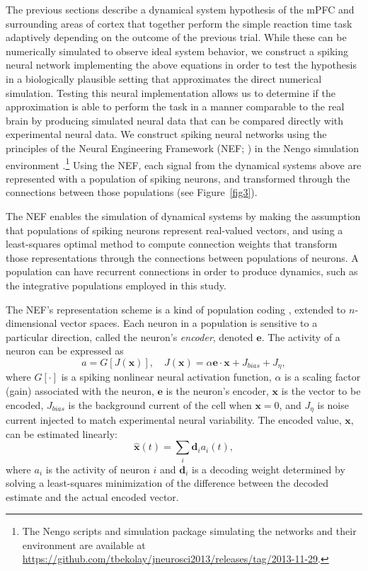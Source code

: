 \documentclass[11pt]{article}
\begin{document}
The previous sections describe
a dynamical system hypothesis
of the mPFC and surrounding areas
of cortex that together
perform the simple reaction time task
adaptively depending on the outcome
of the previous trial.
While these can be numerically simulated
to observe ideal system behavior,
we construct a spiking neural network
implementing the above equations
in order to test the hypothesis
in a biologically plausible setting
that approximates the direct numerical simulation.
Testing this neural implementation
allows us to determine if the approximation
is able to perform the task
in a manner comparable to the real brain
by producing simulated neural data
that can be compared directly with
experimental neural data.
We construct spiking neural networks
using the principles of the Neural Engineering Framework
(NEF; )
in the Nengo simulation environment
\cite{BekolayInpress}.\footnote{The Nengo scripts and simulation
  package simulating the networks and their environment are available
  at \url{https://github.com/tbekolay/jneurosci2013/releases/tag/2013-11-29}.}
Using the NEF, each signal
from the dynamical systems above
are represented with a population of spiking neurons,
and transformed through the connections
between those populations
(see Figure~\ref{fig3}).

The NEF enables the simulation of dynamical systems
by making the assumption that populations of spiking neurons
represent real-valued vectors,
and using a least-squares optimal method
to compute connection weights that
transform those representations
through the connections between
populations of neurons.
A population can have recurrent connections
in order to produce dynamics,
such as the integrative populations
employed in this study.

The NEF's representation scheme
is a kind of population coding
\cite{Georgopoulos1986,Salinas1994},
extended to $n$-dimensional vector spaces.
Each neuron in a population is sensitive
to a particular direction,
called the neuron's \textit{encoder}, denoted $\mathbf{e}$.
The activity of a neuron can be expressed as
\begin{equation} \label{eq:activity}
  a = G[J(\mathbf{x})], \quad
  J(\mathbf{x}) = \alpha \mathbf{e} \cdot \mathbf{x} + J_{bias} + J_\eta,
\end{equation}
where $G[\cdot]$ is a spiking nonlinear neural activation function,
$\alpha$ is a scaling factor (gain) associated with the neuron,
$\mathbf{e}$ is the neuron's encoder,
$\mathbf{x}$ is the vector to be encoded,
$J_{bias}$ is the background current of the cell
when $\mathbf{x} = 0$,
and $J_\eta$ is noise current injected
to match experimental neural variability.
The encoded value, $\mathbf{x}$,
can be estimated linearly:
\begin{equation*}
  \mathbf{\hat{x}}(t) = \sum_i \mathbf{d}_i a_i(t),
\end{equation*}
where $a_i$ is the activity of neuron $i$
and $\mathbf{d}_i$ is a decoding weight
determined by solving a least-squares minimization
of the difference between the decoded estimate
and the actual encoded vector.
\end{document}
